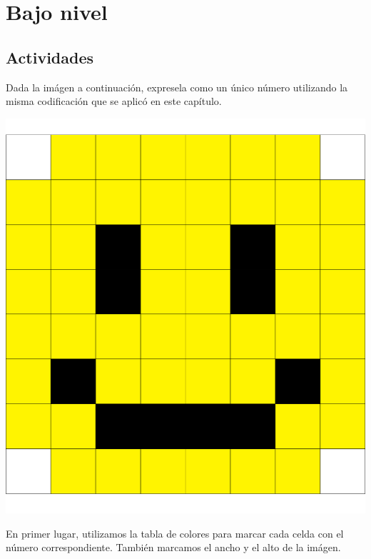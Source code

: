 
\chapter{Bajo nivel}

\setcounter{section}{2}
\section{Actividades}

\begin{exercise}
Dada la imágen a continuación, expresela como un único
número utilizando la misma codificación que se aplicó
en este capítulo.

\centerline{\includegraphics[scale=0.5]{unidades/2_informacion/1_bajo_nivel/imagenes/pixels_smile.png}}
\end{exercise}

En primer lugar, utilizamos la tabla de colores para marcar cada celda con el
número correspondiente. También marcamos el ancho y el alto de la imágen.

